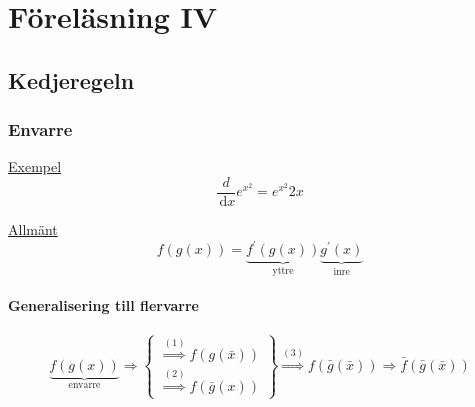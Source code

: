 \documentclass{article}
\begin{document}
\newpage
\section{Föreläsning IV}
\subsection{Kedjeregeln}

\subsubsection*{Envarre}

\underline{Exempel} \[\frac{d}{\,\mathrm{d}x} e^{x^2} = e^{x^2}2x\]

\underline{Allmänt} \[f(g(x)) = \underbrace{f^{\prime}(g(x))}_{\text{yttre}} \underbrace{g^{\prime}(x)}_{\text{inre}} \]

\paragraph{Generalisering till flervarre}

\[
	\underbrace{f(g(x))}_{\text{envarre}} \Rightarrow \left\{\begin{array}{rcl}
	\overset{(1)}{\Rightarrow} f(g(\bar{x})) \\
	\overset{(2)}{\Rightarrow} f(\bar{g}(x))
	\end{array}\right\}
	\overset{(3)}{\Rightarrow} f(\bar{g}(\bar{x})) \Rightarrow \bar{f}(\bar{g}(\bar{x}))
\]
\end{document}
